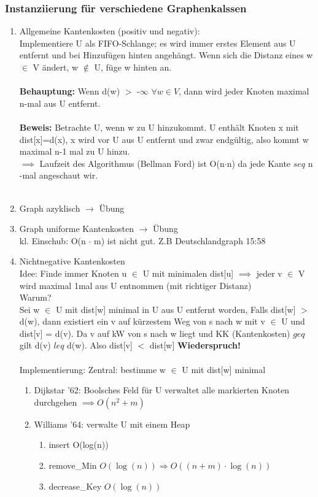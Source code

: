 \documentclass{article}
\begin{document}
\subsubsection{Instanziierung für verschiedene Graphenkalssen}

\begin{enumerate}[label=\Alph*)] 
\item Allgemeine Kantenkosten (positiv und negativ):\\
Implementiere U als FIFO-Schlange; es wird immer erstes Element aus U entfernt und bei Hinzufügen hinten angehängt.
Wenn sich die Distanz eines w $\in$ V ändert, w $\notin$ U, füge w hinten an. \\
\\
\textbf{Behauptung:} Wenn d(w) $>$ -$\infty$ $\forall w \in V$, dann wird jeder Knoten maximal n-mal aus U entfernt.\\
\\
\textbf{Beweis:} Betrachte U, wenn w zu U hinzukommt. U enthält Knoten x mit dist[x]=d(x), x wird vor U aus U entfernt und zwar endgültig, 
also kommt w maximal n-1 mal zu U hinzu.\\
$\implies$ Laufzeit des Algorithmus (Bellman Ford) ist O(n$\cdot$n) da jede Kante $seq$ n -mal angeschaut wir.\\
\\
\item Graph azyklisch $\rightarrow$ Übung
\item Graph uniforme Kantenkosten $\rightarrow$ Übung\\
kl. Einschub: O(n $\cdot$ m) ist nicht gut. Z.B Deutschlandgraph 15:58
\item Nichtnegative Kantenkosten\\
Idee: Finde immer Knoten u $\in$ U mit minimalen dist[u]
$\implies$ jeder v $\in$ V wird maximal 1mal aus U entnommen (mit richtiger Distanz)\\
Warum?\\
Sei w $\in$ U mit dist[w] minimal in U aus U entfernt worden, Falls dist[w] $>$ d(w), dann existiert ein v auf kürzestem Weg von s nach w mit
v $\in$ U und dist[v] = d(v). Da v auf kW von s nach w liegt und KK (Kantenkosten) $geq$ gilt d(v) $leq$ d(w). Also dist[v] $<$ dist[w] {\textbf{Wiederspruch!}}\\
\\
Implementierung: Zentral: bestimme w $\in$ U mit dist[w] minimal 
\begin{enumerate}
  \item Dijkstar '62: Boolsches Feld für U verwaltet alle markierten Knoten durchgehen $\implies O(n^2 +m)$\\
  \item Williams '64: verwalte U mit einem Heap
  \begin{enumerate}
    \item insert O(log(n))
    \item remove\_Min \( O(\log(n)) \Rightarrow O((n+m) \cdot \log(n)) \)
    \item decrease\_Key \( O(\log(n)) \)
  \end{enumerate}
\end{enumerate}


\end{enumerate}
\end{document}
